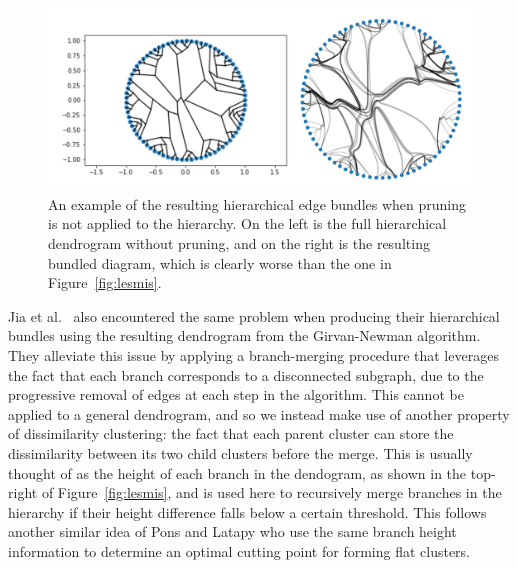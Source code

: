 \begin{figure}
    \centering
    \includegraphics[width=\textwidth]{power/pruning.pdf}
    \caption[Hierarchical edge bundles without pruning]{An example of the resulting hierarchical edge bundles when pruning is not applied to the hierarchy. On the left is the full hierarchical dendrogram without pruning, and on the right is the resulting bundled diagram, which is clearly worse than the one in Figure~\ref{fig:lesmis}.}
    \label{fig:pruning}   
\end{figure}

Jia et al.\ \cite{Jia2011} also encountered the same problem when producing their hierarchical bundles using the resulting dendrogram from the Girvan-Newman algorithm. They alleviate this issue by applying a branch-merging procedure that leverages the fact that each branch corresponds to a disconnected subgraph, due to the progressive removal of edges at each step in the algorithm.
This cannot be applied to a general dendrogram, and so we instead make use of another property of dissimilarity clustering: the fact that each parent cluster can store the dissimilarity between its two child clusters before the merge. This is usually thought of as the height of each branch in the dendogram, as shown in the top-right of Figure~\ref{fig:lesmis}, and is used here to recursively merge branches in the hierarchy if their height difference falls below a certain threshold. This follows another similar idea of Pons and Latapy \cite{Pons2006} who use the same branch height information to determine an optimal cutting point for forming flat clusters.

